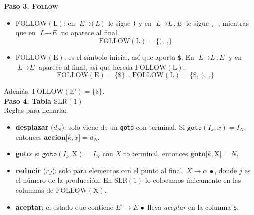 \documentclass[12pt,letterpaper]{article}
\newcommand{\nt}[1]{\textit{#1}}
\newcommand{\tk}[1]{\texttt{#1}}
\newcommand{\tx}[1]{\text{#1}}
\newcommand{\Follow}[1]{\mathrm{FOLLOW}(#1)}
\newcommand{\slr}{\mathrm{SLR(1)}}
\begin{document}
\begin{enumerate}[label=\arabic*.]
  \textbf{Paso 3. \textsc{Follow}}
  \begin{itemize}
  \item $\Follow{\tx{L}}$: en $\nt{E}\to\tk{(}\,\nt{L}\,\tk{)}$ le sigue \tk{)} y en
    $\nt{L}\to\nt{L}\,\tk{,}\,\nt{E}$ le sigue \tk{,}\ , mientras que en $\nt{L}\to\nt{E}$ no aparece al final.
    \[
    \Follow{\tx{L}} = \{\tk{)},\ \tk{,}\}
    \]

  \item $\Follow{\tx{E}}$: es el símbolo inicial, así que aporta \tk{\$}. En $\nt{L}\to\nt{L}\,\tk{,}\,\nt{E}$
    y en $\nt{L}\to\nt{E}$ aparece al final, así que hereda $\Follow{\tx{L}}$.
    \[
    \Follow{\tx{E}} = \{\tk{\$}\} \cup \Follow{\tx{L}} = \{\tk{\$},\ \tk{)},\ \tk{,}\}
    \]
  \end{itemize}
  Además, $\Follow{\tx{E'}} = \{\tk{\$}\}$.\\

  \textbf{Paso 4. Tabla $\slr$}\\
  Reglas para llenarla:
  \begin{itemize}
  \item \textbf{desplazar} ($d_N$): solo viene de un \texttt{goto} con terminal.
    Si $\texttt{goto}(I_k,x)=I_N$, entonces $\textbf{accion}\tk{[} k, x \tk{]} = d_N$.
    
  \item \textbf{goto}: si $\texttt{goto}(I_k, \tx{X}) = I_N$ con \nt{X} no terminal, entonces
    $\textbf{goto}\tk{[}k, \tx{X} \tk{]} = N$.
    
  \item \textbf{reducir} ($r_J$): solo para elementos con el punto al final, $\nt{X}\to\alpha\,\bullet$,
    donde $j$ es el número de la producción. En $\slr$ lo colocamos únicamente en las columnas de
    $\Follow{\tx{X}}$.
    
  \item \textbf{aceptar}: el estado que contiene $\nt{E'}\to\nt{E}\,\bullet$ lleva \textit{aceptar}
    en la columna \tk{\$}.
  \end{itemize}
  

\end{enumerate}
\end{document}
